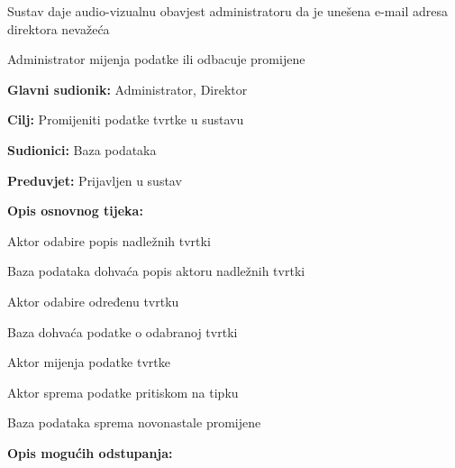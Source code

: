\begin{packed_item}
\begin{packed_item}
\begin{packed_enum}
								\item Sustav daje audio-vizualnu obavjest administratoru da je unešena e-mail adresa direktora nevažeća
								\item Administrator mijenja podatke ili odbacuje promijene
								
							\end{packed_enum}
							
						\end{packed_item}
					\end{packed_item}
					
					\clearpage
					
					\noindent {}
					\begin{packed_item}
						
						\item \textbf{Glavni sudionik: }Administrator, Direktor
						\item  \textbf{Cilj:} Promijeniti podatke tvrtke u sustavu
						\item  \textbf{Sudionici:} Baza podataka
						\item  \textbf{Preduvjet:} Prijavljen u sustav
						\item  \textbf{Opis osnovnog tijeka:}
						
						\item[] \begin{packed_enum}
							
							\item Aktor odabire popis nadležnih tvrtki
							\item Baza podataka dohvaća popis aktoru nadležnih tvrtki
							\item Aktor odabire određenu tvrtku
							\item Baza dohvaća podatke o odabranoj tvrtki
							\item Aktor mijenja podatke tvrtke
							\item Aktor sprema podatke pritiskom na tipku
							\item Baza podataka sprema novonastale promijene
							
						\end{packed_enum}
						
						\item  \textbf{Opis mogućih odstupanja:}
						
						\item[] \begin{packed_item}
							

\end{packed_item}
\end{packed_item}
